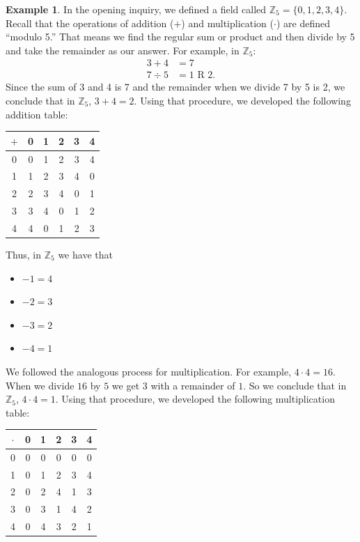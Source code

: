 \documentclass[11pt]{article}
\theoremstyle{definition}
\newtheorem{example}[theorem]{Example}
\begin{document}
\begin{example}
  In the opening inquiry, we defined a field called $\mathbb{Z}_5 = \{ 0, 1, 2, 3, 4\}$. Recall that the operations of addition ($+$) and multiplication ($\cdot$) are defined ``modulo 5.'' That means we find
  the regular sum or product and then divide by 5 and take the remainder as our answer. For example, in $\mathbb{Z}_5$:
  \begin{align*}
    3 + 4 &= 7\\
    7 \div 5 &= 1 \text{ R } 2.
  \end{align*}
  Since the sum of 3 and 4 is 7 and the remainder when we divide 7 by 5 is 2, we conclude that in $\mathbb{Z}_5$, $3 + 4 = 2$. Using that procedure, we 
  developed the following addition table:

  \begin{center}
    \begin{tabular}{|c|c|c|c|c|c|}\\ \hline
      $+$ & 0 & 1 & 2 & 3 & 4 \\ \hline
      0   & 0 & 1 & 2 & 3 & 4 \\ \hline
      1   & 1 & 2 & 3 & 4 & 0 \\ \hline
      2   & 2 & 3 & 4 & 0 & 1 \\ \hline
      3   & 3 & 4 & 0 & 1 & 2 \\ \hline
      4   & 4 & 0 & 1 & 2 & 3 \\ \hline
    \end{tabular}
  \end{center}
  Thus, in $\mathbb{Z}_5$ we have that
  \begin{itemize}
    \item $-1 = 4$
    \item $-2 = 3$
    \item $-3 = 2$
    \item $-4 = 1$
  \end{itemize}

  We followed the analogous process for multiplication. For example, $4 \cdot 4 = 16$. When we divide $16$ by $5$ we get $3$ with a remainder of $1$. So we
  conclude that in $\mathbb{Z}_5$, $4 \cdot 4 = 1$. Using that procedure, we developed the following multiplication table:

  \begin{center}
    \begin{tabular}{|c|c|c|c|c|c|}\\ \hline
      $\cdot$ & 0 & 1 & 2 & 3 & 4 \\ \hline
      0       & 0 & 0 & 0 & 0 & 0 \\ \hline
      1       & 0 & 1 & 2 & 3 & 4 \\ \hline
      2       & 0 & 2 & 4 & 1 & 3 \\ \hline
      3       & 0 & 3 & 1 & 4 & 2 \\ \hline
      4       & 0 & 4 & 3 & 2 & 1 \\ \hline
    \end{tabular}
  \end{center}


\end{example}
\end{document}
